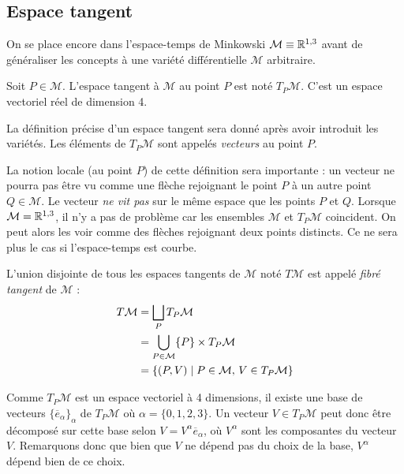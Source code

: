 {\subsection{Espace tangent}
On se place encore dans l'espace-temps de Minkowski $\mathcal{M} \equiv \mathbb{R}^{1,3}$ avant de généraliser les concepts à une variété différentielle $\mathcal{M}$ arbitraire.

\begin{theoremframe}
    \begin{notat}
        Soit $P\in \mathcal{M}$. L'espace tangent à $\mathcal{M}$ au point $P$ est noté $T_P\mathcal{M}$. C'est un espace vectoriel réel de dimension 4.
    \end{notat}
\end{theoremframe}
La définition précise d'un espace tangent sera donné après avoir introduit les variétés. Les éléments de $T_P\mathcal{M}$ sont appelés \textit{vecteurs} au point $P$. 
\begin{rmk}
    La notion locale (au point $P$) de cette définition sera importante : un vecteur ne pourra pas être vu comme une flèche rejoignant le point $P$ à un autre point $Q \in \mathcal{M}$. Le vecteur \textit{ne vit pas} sur le même espace que les points $P$ et $Q$. Lorsque $\mathcal{M} = \mathbb{R}^{1,3}$, il n'y a pas de problème car les ensembles $\mathcal{M}$ et $T_P\mathcal{M}$ coincident. On peut alors les voir comme des flèches rejoignant deux points distincts. Ce ne sera plus le cas si l'espace-temps est courbe.
\end{rmk}
\begin{theoremframe}
    \begin{defi}
        L'union disjointe de tous les espaces tangents de $\mathcal{M}$ noté $T\mathcal{M}$ est appelé \textit{fibré tangent} de $\mathcal{M}$ :
        \begin{align}
            T\mathcal{M} &= \bigsqcup_P T_P\mathcal{M} \\
            & = \bigcup_{P \in \mathcal{M}} \{ P\} \times T_P \mathcal{M} \\
            & = \{ (P,V) \mid P \in \mathcal{M}, \, V \in T_P\mathcal{M}\}
        \end{align}
    \end{defi}
\end{theoremframe}
Comme $T_P\mathcal{M}$ est un espace vectoriel à 4 dimensions, il existe une base de vecteurs $\{\overline{e}_\alpha\}_\alpha$ de $T_P\mathcal{M}$ où $\alpha = \{0,1,2,3\}$. Un vecteur $V \in T_P\mathcal{M}$ peut donc être décomposé sur cette base selon $V = V^\alpha \overline{e}_\alpha$, où $V^\alpha$ sont les composantes du vecteur $V$. Remarquons donc que bien que $V$ ne dépend pas du choix de la base, $V^\alpha$ dépend bien de ce choix.
}
